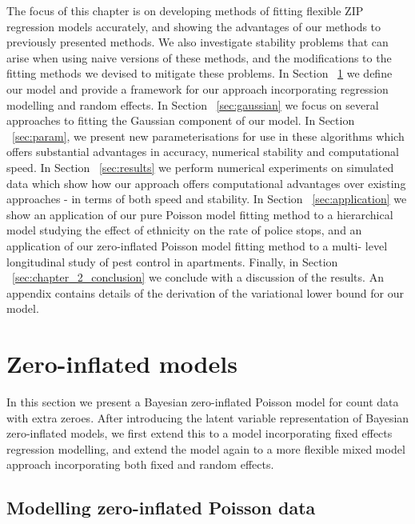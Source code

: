 The focus of this chapter is on developing methods of fitting flexible ZIP
regression models accurately, and showing the advantages of our methods to
previously presented methods. We also investigate stability problems that can
arise when using naive versions of these methods, and the modifications to the
fitting methods we devised to mitigate these problems. In Section
~\ref{sec:zero_inflated_model} we define our model and provide a framework for
our approach incorporating regression modelling and random effects. In Section
~\ref{sec:gaussian} we focus on several approaches to fitting the Gaussian
component of our model. In Section ~\ref{sec:param}, we present new
parameterisations for use in these algorithms which offers substantial
advantages in accuracy, numerical stability and computational speed. In Section
~\ref{sec:results} we perform numerical experiments on simulated data which
show how our approach offers computational advantages over existing approaches
- in terms of both speed and stability. In Section ~\ref{sec:application} we
show an application of our pure Poisson model fitting method to a hierarchical
model studying the effect of ethnicity on the rate of police stops, and an
application of our zero-inflated Poisson model fitting method to a multi- level
longitudinal study of pest control in apartments. Finally, in Section
~\ref{sec:chapter_2_conclusion} we conclude with a discussion of the results.
An appendix contains details of the derivation of the variational lower bound
for our model.

\section{Zero-inflated models}
\label{sec:zero_inflated_model}

In this section we present a Bayesian zero-inflated Poisson model for count
data with extra zeroes. After introducing the latent variable representation of
Bayesian zero-inflated models, we first extend this to a model incorporating
fixed effects regression modelling, and extend the model again to a more
flexible mixed model approach incorporating both fixed and random effects.

\subsection{Modelling zero-inflated Poisson data}

